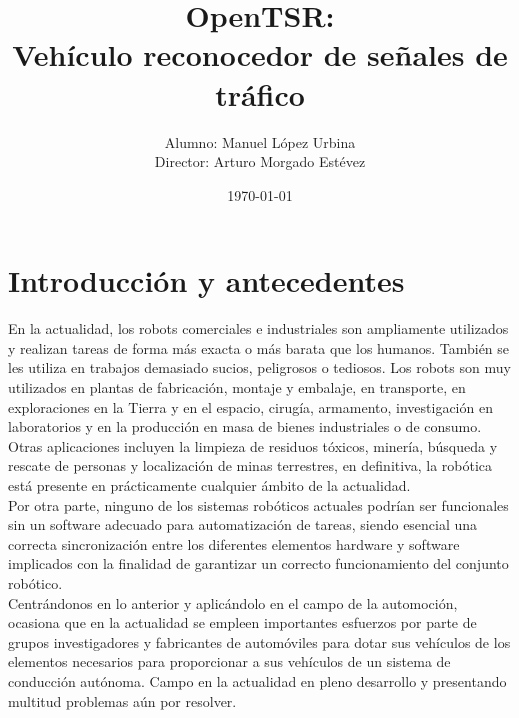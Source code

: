 \documentclass[a4paper,12pt]{article}
\title{OpenTSR: \\ Vehículo reconocedor de señales de tráfico}
\author{Alumno: Manuel López Urbina\\Director: Arturo Morgado Estévez}
\date{\today}
\begin{document}


\maketitle
\pagestyle{empty}
\tableofcontents 

\cleardoublepage
\pagestyle{plain}
\section{Introducción y antecedentes}

En la actualidad, los robots comerciales e industriales son ampliamente utilizados y realizan tareas de forma más exacta o más barata que los humanos. También se les utiliza en trabajos demasiado sucios, peligrosos o tediosos. Los robots son muy utilizados en plantas de fabricación, montaje y embalaje, en transporte, en exploraciones en la Tierra y en el espacio, cirugía, armamento, investigación en laboratorios y en la producción en masa de bienes industriales o de consumo. Otras aplicaciones incluyen la limpieza de residuos tóxicos, minería, búsqueda y rescate de personas y localización de minas terrestres, en definitiva, la robótica está presente en prácticamente cualquier ámbito de la actualidad.\\

Por otra parte, ninguno de los sistemas robóticos actuales podrían ser funcionales sin un software adecuado para automatización de tareas, siendo esencial una correcta sincronización entre los diferentes elementos hardware y software implicados con la finalidad de garantizar un correcto funcionamiento del conjunto robótico.\\

Centrándonos en lo anterior y aplicándolo en el campo de la automoción, ocasiona que en la actualidad se empleen importantes esfuerzos por parte de grupos investigadores y fabricantes de automóviles para dotar sus vehículos de los elementos necesarios para proporcionar a sus vehículos de un sistema de conducción autónoma. Campo en la actualidad en pleno desarrollo y presentando multitud problemas aún por resolver.\\
\end{document}
